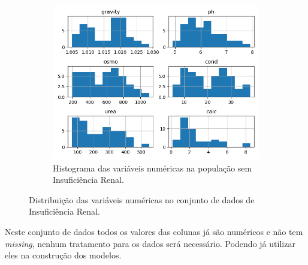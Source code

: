 \begin{figure}[H]
     \hfill
     \begin{subfigure}[b]{0.3\textwidth}
 \caption{Histograma das variáveis numéricas na população sem Insuficiência Renal.}
 \label{fig:var:3:kindney}
 \centering
\includegraphics[scale=0.3]{images/hist_kindey_no.png}
     \end{subfigure}
        \caption{Distribuição das variáveis numéricas no conjunto de dados de Insuficiência Renal.}
         \label{fig:var:kindney:t}
\end{figure}

Neste conjunto de dados todos os valores das colunas já são numéricos e não tem \textit{missing}, nenhum tratamento para os dados será necessário. Podendo já utilizar eles na construção dos modelos.
